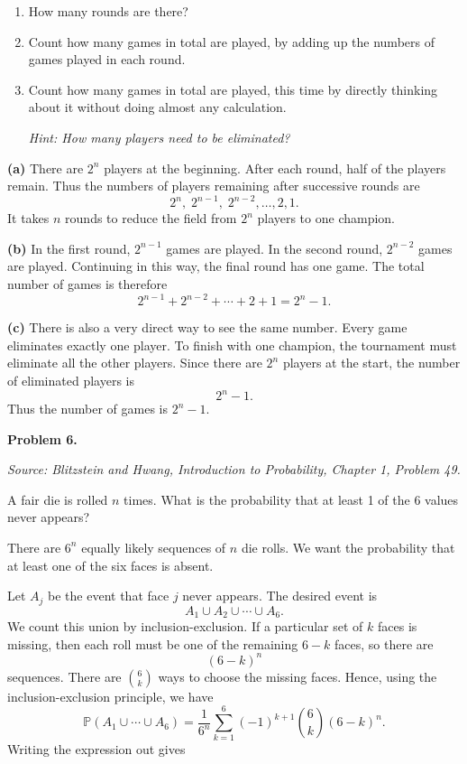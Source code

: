 \documentclass[11pt]{article}
\newcommand{\source}[1]{%
    \vspace{0.15cm}
    {\small\textit{Source: Blitzstein and Hwang, \textit{Introduction to Probability}, Chapter 1, Problem #1.}}
}
\begin{document}
\begin{enumerate}[label=(\alph*), leftmargin=*]
    \item How many rounds are there?

    \item Count how many games in total are played, by adding up the numbers of games played in each round.

    \item Count how many games in total are played, this time by directly thinking about it without doing almost any calculation.

    \emph{Hint: How many players need to be eliminated?}
\end{enumerate}

\begin{solutionbox}
\textbf{(a)} There are \(2^n\) players at the beginning. After each round, half of the players remain. Thus the numbers of players remaining after successive rounds are
\[
2^n,\;2^{n-1},\;2^{n-2},\ldots,2,1.
\]
It takes \(n\) rounds to reduce the field from \(2^n\) players to one champion.


\textbf{(b)} In the first round, \(2^{n-1}\) games are played. In the second round, \(2^{n-2}\) games are played. Continuing in this way, the final round has one game. The total number of games is therefore
\[
2^{n-1}+2^{n-2}+\cdots+2+1
=
2^n-1.
\]



\textbf{(c)} There is also a very direct way to see the same number. Every game eliminates exactly one player. To finish with one champion, the tournament must eliminate all the other players. Since there are \(2^n\) players at the start, the number of eliminated players is
\[
2^n-1.
\]
Thus the number of games is \(2^n-1\).

\end{solutionbox}
\newpage


\begin{problemheader}
\textbf{Problem 6. } \hfill  
\end{problemheader}
\source{49}

A fair die is rolled $n$ times. What is the probability that at least 1 of the 6 values never appears?

\begin{solutionbox}
There are \(6^n\) equally likely sequences of \(n\) die rolls. We want the probability that at least one of the six faces is absent.

Let \(A_j\) be the event that face \(j\) never appears. The desired event is
\[
A_1\cup A_2\cup\cdots\cup A_6.
\]
We count this union by inclusion-exclusion. If a particular set of \(k\) faces is missing, then each roll must be one of the remaining \(6-k\) faces, so there are
\[
(6-k)^n
\]
sequences. There are \(\binom{6}{k}\) ways to choose the missing faces. Hence, using the inclusion-exclusion principle, we have
\[
\mathbb{P}(A_1\cup\cdots\cup A_6)
=
\frac{1}{6^n}
\sum_{k=1}^{6}
(-1)^{k+1}\binom{6}{k}(6-k)^n.
\]
Writing the expression out gives


\end{solutionbox}
\newpage
\end{document}

